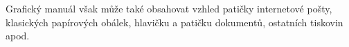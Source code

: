     Grafický manuál však může také obsahovat vzhled patičky internetové pošty, klasických papírových obálek,
    hlavičku a patičku dokumentů, ostatních tiskovin apod. 

    

    

    

    




\endinput